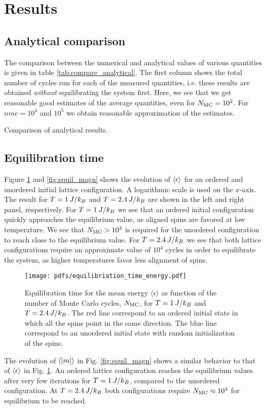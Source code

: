 \section{Results}\label{sec:results}
\subsection{Analytical comparison}\label{subsec_results:analytical}
The comparison between the numerical and analytical values of various quantities is given in table \ref{tab:compare_analytical}. The first column shows the total number of cycles run for each of the measured quantities, i.e. these results are obtained \textit{without} equilibrating the system first. Here, we see that we get reasonable good estimates of the average quantities, even for $N_\mathrm{MC}=10^2$. For $nmc=10^4$ and $10^5$ we obtain reasonable approximation of the estimates.  

\begin{table}[!ht]
    
    \caption{Comparison of analytical results. }
    \label{tab:compare_analytical}
\end{table}


\subsection{Equilibration time}\label{subsec_results:equilibriation_time}
Figure \ref{fig:equil_energy} and \ref{fig:equil_magn} shows the evolution of $\expval{\epsilon}$ for an ordered and unordered initial lattice configuration. A logarithmic scale is used on the $x$-axis. The result for $T=1\,J/k_B$ and $T=2.4\,J/k_B$ are shown in the left and right panel, respectively. For $T=1\,J/k_B$ we see that an ordered initial configuration quickly approaches the equilibrium value, as aligned spins are favored at low temperature. We see that $N_\mathrm{MC}>10^3$ is required for the unordered configuration to reach close to the equilibrium value. For $T=2.4\,J/k_B$ we see that both lattice configurations require an approximate value of $10^4$ cycles in order to equilibrate the system, as higher temperatures favor less alignment of spins.    
\begin{figure}[!ht]
    \texttt{[image: pdfs/equilibriation\_time\_energy.pdf]}
    \caption{Equilibration time for the mean energy $\langle \epsilon \rangle $ as function of the number of Monte Carlo cycles, $N_\mathrm{MC}$, for $T=1\,J/k_B$ and $T=2.4\,J/k_B$. The red line correspond to an ordered initial state in which all the spins point in the same direction. The blue line correspond to an unordered initial state with random initialization of the spins.}
    \label{fig:equil_energy}
\end{figure}
The evolution of $\expval{\abs{m}}$ in Fig. \ref{fig:equil_magn} shows a similar behavior to that of $\expval{\epsilon}$ in Fig. \ref{fig:equil_energy}. An ordered lattice configuration reaches the equilibrium values after very few iterations for $T=1\,J/k_B$, compared to the unordered configuration. At $T=2.4\,J/k_B$ both configurations require $N_\mathrm{MC}\approx10^4$ for equilibrium to be reached. 

